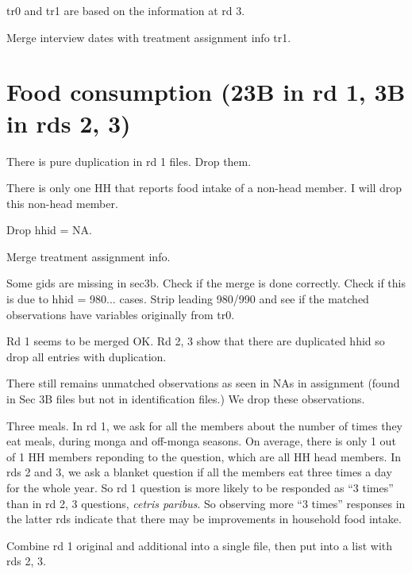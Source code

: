 \textsf{tr0} and \textsf{tr1} are based on the information at rd 3.

Merge interview dates with treatment assignment info \textsf{tr1}.




\section{Food consumption (23B in rd 1, 3B in rds 2, 3)}



There is pure duplication in rd 1 files. Drop them.

There is only one HH that reports food intake of a non-head member. I will drop this non-head member.

Drop hhid = NA.

Merge treatment assignment info.

Some \textsf{gid}s are missing in sec3b. Check if the merge is done correctly. Check if this is due to hhid = 980... cases. Strip leading 980/990 and see if the matched observations have variables originally from \textsf{tr0}.

Rd 1 seems to be merged OK. Rd 2, 3 show that there are duplicated \textsf{hhid} so drop all entries with duplication.

There still remains unmatched observations as seen in NAs in \textsf{assignment} (found in Sec 3B files but not in identification files.) We drop these observations.



	Three meals. In rd 1, we ask for all the members about the number of times they eat meals, during monga and off-monga seasons. On average, there is only 1 out of 1 HH members reponding to the question, which are all HH head members. In rds 2 and 3, we ask a blanket question if all the members eat three times a day for the whole year. So rd 1 question is more likely to be responded as ``3 times'' than in rd 2, 3 questions, \textit{cetris paribus}. So observing more ``3 times'' responses in the latter rds indicate that there may be improvements in household food intake. 


Combine rd 1 original and additional into a single file, then put into a list with rds 2, 3.

